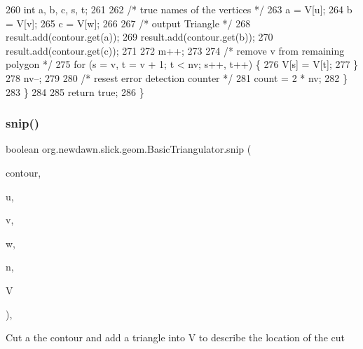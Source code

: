 \begin{DoxyCode}
260                 \textcolor{keywordtype}{int} a, b, c, s, t;
261 
262                 \textcolor{comment}{/* true names of the vertices */}
263                 a = V[u];
264                 b = V[v];
265                 c = V[w];
266 
267                 \textcolor{comment}{/* output Triangle */}
268                 result.add(contour.get(a));
269                 result.add(contour.get(b));
270                 result.add(contour.get(c));
271 
272                 m++;
273 
274                 \textcolor{comment}{/* remove v from remaining polygon */}
275                 \textcolor{keywordflow}{for} (s = v, t = v + 1; t < nv; s++, t++) \{
276                     V[s] = V[t];
277                 \}
278                 nv--;
279 
280                 \textcolor{comment}{/* resest error detection counter */}
281                 count = 2 * nv;
282             \}
283         \}
284 
285         \textcolor{keywordflow}{return} \textcolor{keyword}{true};
286     \}
\end{DoxyCode}
\mbox{\label{classorg_1_1newdawn_1_1slick_1_1geom_1_1_basic_triangulator_a7b9644fd18ac42ce0f128db555d77606}} 
\subsubsection{\texorpdfstring{snip()}{snip()}}
{\footnotesize\ttfamily boolean org.\+newdawn.\+slick.\+geom.\+Basic\+Triangulator.\+snip (\begin{DoxyParamCaption}\item[{\mbox{\hyperlink{classorg_1_1newdawn_1_1slick_1_1geom_1_1_basic_triangulator_1_1_point_list}{Point\+List}}}]{contour,  }\item[{int}]{u,  }\item[{int}]{v,  }\item[{int}]{w,  }\item[{int}]{n,  }\item[{int \mbox{[}$\,$\mbox{]}}]{V }\end{DoxyParamCaption})\hspace{0.3cm}{\ttfamily [inline]}, {\ttfamily [private]}}

Cut a the contour and add a triangle into V to describe the location of the cut


